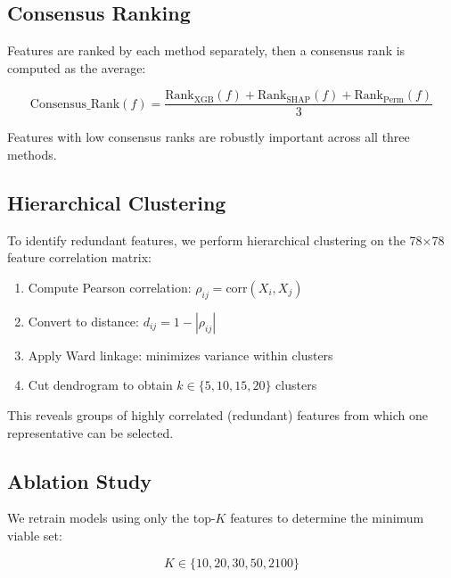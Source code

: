 \documentclass[11pt,a4paper]{article}
\begin{document}
\subsection{Consensus Ranking}

Features are ranked by each method separately, then a consensus rank is computed as the average:

\begin{equation}
    \text{Consensus\_Rank}(f) = \frac{\text{Rank}_{\text{XGB}}(f) + \text{Rank}_{\text{SHAP}}(f) + \text{Rank}_{\text{Perm}}(f)}{3}
\end{equation}

Features with low consensus ranks are robustly important across all three methods.

\subsection{Hierarchical Clustering}

To identify redundant features, we perform hierarchical clustering on the 78$\times$78 feature correlation matrix:

\begin{enumerate}
    \item Compute Pearson correlation: $\rho_{ij} = \text{corr}(X_i, X_j)$
    \item Convert to distance: $d_{ij} = 1 - |\rho_{ij}|$
    \item Apply Ward linkage: minimizes variance within clusters
    \item Cut dendrogram to obtain $k \in \{5, 10, 15, 20\}$ clusters
\end{enumerate}

This reveals groups of highly correlated (redundant) features from which one representative can be selected.

\subsection{Ablation Study}

We retrain models using only the top-$K$ features to determine the minimum viable set:

\begin{equation}
    K \in \{10, 20, 30, 50, 2100\}
\end{equation}
\end{document}
